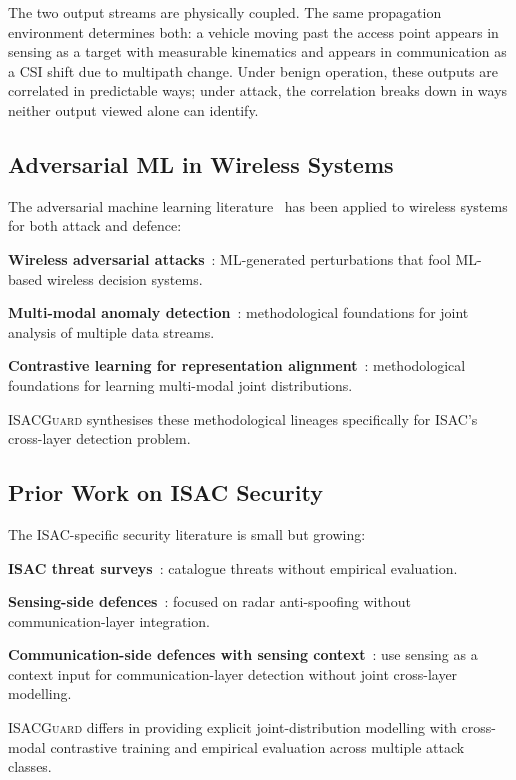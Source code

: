 \documentclass[sigconf,nonacm]{acmart}
\begin{document}
The two output streams are physically coupled. The same propagation
environment determines both: a vehicle moving past the access point
appears in sensing as a target with measurable kinematics and
appears in communication as a CSI shift due to multipath change.
Under benign operation, these outputs are correlated in
predictable ways; under attack, the correlation breaks down in
ways neither output viewed alone can identify.

\subsection{Adversarial ML in Wireless Systems}

The adversarial machine learning
literature~\cite{biggio2018wild,goodfellow2014fgsm} has been
applied to wireless systems for both attack and defence:

\textbf{Wireless adversarial attacks}~\cite{shi2024advrff,
sagduyu2024advcomm}: ML-generated perturbations that fool
ML-based wireless decision systems.

\textbf{Multi-modal anomaly detection}~\cite{ramachandram2017multimodal,
liu2024multimodalsurv}: methodological foundations for joint
analysis of multiple data streams.

\textbf{Contrastive learning for representation alignment}~\cite{chen2020simclr,
radford2021clip}: methodological foundations for learning
multi-modal joint distributions.

\textsc{ISACGuard} synthesises these methodological lineages
specifically for ISAC's cross-layer detection problem.

\subsection{Prior Work on ISAC Security}

The ISAC-specific security literature is small but growing:

\textbf{ISAC threat surveys}~\cite{wang2024isacsec,
shafee2024thznetsec}: catalogue threats without empirical
evaluation.

\textbf{Sensing-side defences}~\cite{krayem2024radarspoofing}:
focused on radar anti-spoofing without communication-layer
integration.

\textbf{Communication-side defences with sensing context}~\cite{xu2024sensingaidedsec}:
use sensing as a context input for communication-layer
detection without joint cross-layer modelling.

\textsc{ISACGuard} differs in providing explicit
joint-distribution modelling with cross-modal contrastive
training and empirical evaluation across multiple
attack classes.
\end{document}
